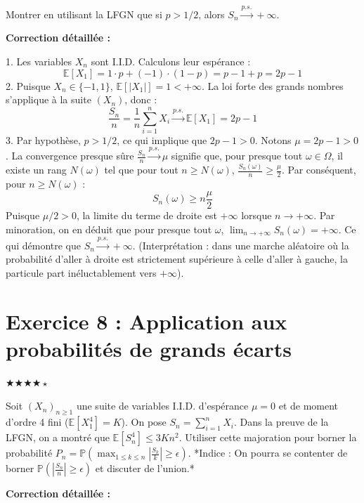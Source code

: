 \documentclass[11pt,a4paper]{article}
\begin{document}
Montrer en utilisant la LFGN que si $p > 1/2$, alors $S_n \xrightarrow{p.s.} +\infty$.

\textbf{Correction détaillée :}

1. Les variables $X_n$ sont I.I.D.
   Calculons leur espérance :
   $$ \mathbb{E}[X_1] = 1 \cdot p + (-1) \cdot (1-p) = p - 1 + p = 2p - 1 $$
2. Puisque $X_n \in \{-1, 1\}$, $\mathbb{E}[|X_1|] = 1 < +\infty$.
   La loi forte des grands nombres s'applique à la suite $(X_n)$, donc :
   $$ \frac{S_n}{n} = \frac{1}{n} \sum_{i=1}^n X_i \xrightarrow{p.s.} \mathbb{E}[X_1] = 2p - 1 $$
3. Par hypothèse, $p > 1/2$, ce qui implique que $2p - 1 > 0$. Notons $\mu = 2p - 1 > 0$.
   La convergence presque sûre $\frac{S_n}{n} \xrightarrow{p.s.} \mu$ signifie que, pour presque tout $\omega \in \Omega$, il existe un rang $N(\omega)$ tel que pour tout $n \geq N(\omega)$, $\frac{S_n(\omega)}{n} \geq \frac{\mu}{2}$.
   Par conséquent, pour $n \geq N(\omega)$ :
   $$ S_n(\omega) \geq n \frac{\mu}{2} $$
   Puisque $\mu/2 > 0$, la limite du terme de droite est $+\infty$ lorsque $n \to +\infty$.
   Par minoration, on en déduit que pour presque tout $\omega$, $\lim_{n \to +\infty} S_n(\omega) = +\infty$.
   Ce qui démontre que $S_n \xrightarrow{p.s.} +\infty$.
   (Interprétation : dans une marche aléatoire où la probabilité d'aller à droite est strictement supérieure à celle d'aller à gauche, la particule part inéluctablement vers $+\infty$).


\section*{Exercice 8 : Application aux probabilités de grands écarts}

$\bigstar\bigstar\bigstar\bigstar\star$

Soit $(X_n)_{n \geq 1}$ une suite de variables I.I.D. d'espérance $\mu = 0$ et de moment d'ordre 4 fini ($\mathbb{E}[X_1^4] = K$).
On pose $S_n = \sum_{i=1}^n X_i$.
Dans la preuve de la LFGN, on a montré que $\mathbb{E}[S_n^4] \leq 3K n^2$.
Utiliser cette majoration pour borner la probabilité $P_n = \mathbb{P}\left(\max_{1 \le k \le n} \left|\frac{S_k}{k}\right| \ge \epsilon\right)$.
*Indice : On pourra se contenter de borner $\mathbb{P}\left(\left|\frac{S_n}{n}\right| \ge \epsilon\right)$ et discuter de l'union.*

\textbf{Correction détaillée :}
\end{document}
